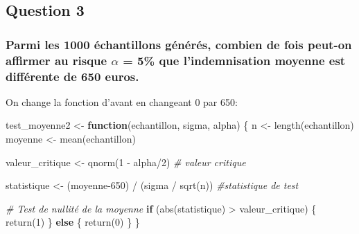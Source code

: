 \documentclass[
]{article}
\newenvironment{Shaded}{\begin{snugshade}}{\end{snugshade}}
\newcommand{\CommentTok}[1]{\textcolor[rgb]{0.56,0.35,0.01}{\textit{#1}}}
\newcommand{\ControlFlowTok}[1]{\textcolor[rgb]{0.13,0.29,0.53}{\textbf{#1}}}
\newcommand{\DecValTok}[1]{\textcolor[rgb]{0.00,0.00,0.81}{#1}}
\newcommand{\FunctionTok}[1]{\textcolor[rgb]{0.00,0.00,0.00}{#1}}
\newcommand{\NormalTok}[1]{#1}
\newcommand{\OtherTok}[1]{\textcolor[rgb]{0.56,0.35,0.01}{#1}}
\newcommand{\SpecialCharTok}[1]{\textcolor[rgb]{0.00,0.00,0.00}{#1}}
\begin{document}
\hypertarget{question-3}{%
\subsection{Question 3}\label{question-3}}

\hypertarget{parmi-les-1000-uxe9chantillons-guxe9nuxe9ruxe9s-combien-de-fois-peut-on-affirmer-au-risque-alpha-5-que-lindemnisation-moyenne-est-diffuxe9rente-de-650-euros.}{%
\subsubsection{\texorpdfstring{Parmi les 1000 échantillons générés,
combien de fois peut-on affirmer au risque \(\alpha\) = 5\% que
l'indemnisation moyenne est différente de 650
euros.}{Parmi les 1000 échantillons générés, combien de fois peut-on affirmer au risque \textbackslash alpha = 5\% que l'indemnisation moyenne est différente de 650 euros.}}\label{parmi-les-1000-uxe9chantillons-guxe9nuxe9ruxe9s-combien-de-fois-peut-on-affirmer-au-risque-alpha-5-que-lindemnisation-moyenne-est-diffuxe9rente-de-650-euros.}}

On change la fonction d'avant en changeant 0 par 650:

\begin{Shaded}
\begin{Highlighting}[]
\NormalTok{test\_moyenne2 }\OtherTok{\textless{}{-}} \ControlFlowTok{function}\NormalTok{(echantillon, sigma, alpha) \{}
\NormalTok{  n }\OtherTok{\textless{}{-}} \FunctionTok{length}\NormalTok{(echantillon)}
\NormalTok{  moyenne }\OtherTok{\textless{}{-}} \FunctionTok{mean}\NormalTok{(echantillon) }
  
\NormalTok{  valeur\_critique }\OtherTok{\textless{}{-}} \FunctionTok{qnorm}\NormalTok{(}\DecValTok{1} \SpecialCharTok{{-}}\NormalTok{ alpha}\SpecialCharTok{/}\DecValTok{2}\NormalTok{)  }\CommentTok{\# valeur critique}
  
 
\NormalTok{  statistique }\OtherTok{\textless{}{-}}\NormalTok{ (moyenne}\DecValTok{{-}650}\NormalTok{) }\SpecialCharTok{/}\NormalTok{ (sigma }\SpecialCharTok{/} \FunctionTok{sqrt}\NormalTok{(n)) }\CommentTok{\#statistique de test}
  
  \CommentTok{\# Test de nullité de la moyenne}
  \ControlFlowTok{if}\NormalTok{ (}\FunctionTok{abs}\NormalTok{(statistique) }\SpecialCharTok{\textgreater{}}\NormalTok{ valeur\_critique) \{}
    \FunctionTok{return}\NormalTok{(}\DecValTok{1}\NormalTok{)  }
\NormalTok{  \} }\ControlFlowTok{else}\NormalTok{ \{}
    \FunctionTok{return}\NormalTok{(}\DecValTok{0}\NormalTok{)  }
\NormalTok{  \}}
\NormalTok{\}}
\end{Highlighting}
\end{Shaded}
\end{document}
